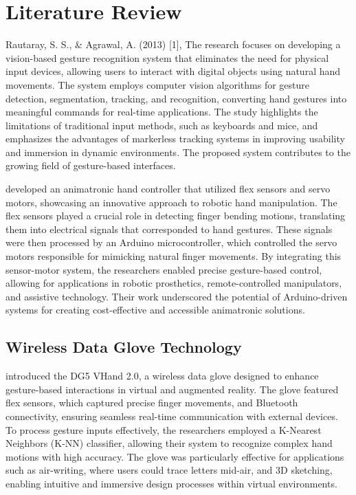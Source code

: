 \section{Literature Review}
\label{sec:literature}

Rautaray, S. S., & Agrawal, A. (2013) [1], The research focuses on developing a vision-based gesture recognition system that eliminates the need for physical input devices, allowing users to interact with digital objects using natural hand movements. The system employs computer vision algorithms for gesture detection, segmentation, tracking, and recognition, converting hand gestures into meaningful commands for real-time applications. The study highlights the limitations of traditional input methods, such as keyboards and mice, and emphasizes the advantages of markerless tracking systems in improving usability and immersion in dynamic environments. The proposed system contributes to the growing field of gesture-based interfaces.

\citet{Chowdhury2013} developed an animatronic hand controller that utilized flex sensors and servo motors, showcasing an innovative approach to robotic hand manipulation. The flex sensors played a crucial role in detecting finger bending motions, translating them into electrical signals that corresponded to hand gestures. These signals were then processed by an Arduino microcontroller, which controlled the servo motors responsible for mimicking natural finger movements. By integrating this sensor-motor system, the researchers enabled precise gesture-based control, allowing for applications in robotic prosthetics, remote-controlled manipulators, and assistive technology. Their work underscored the potential of Arduino-driven systems for creating cost-effective and accessible animatronic solutions.

\subsection{Wireless Data Glove Technology}
\citet{Kumar2012} introduced the DG5 VHand 2.0, a wireless data glove designed to enhance gesture-based interactions in virtual and augmented reality. The glove featured flex sensors, which captured precise finger movements, and Bluetooth connectivity, ensuring seamless real-time communication with external devices. To process gesture inputs effectively, the researchers employed a K-Nearest Neighbors (K-NN) classifier, allowing their system to recognize complex hand motions with high accuracy. The glove was particularly effective for applications such as air-writing, where users could trace letters mid-air, and 3D sketching, enabling intuitive and immersive design processes within virtual environments.

